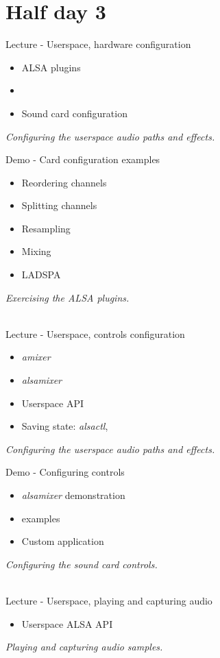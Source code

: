 \documentclass[a4paper,12pt,obeyspaces,spaces,hyphens]{article}
\begin{document}
\section{Half day 3}

\feagendatwocolumn
{Lecture - Userspace, hardware configuration}
{
  \begin{itemize}
  \item ALSA plugins
  \item {}
  \item Sound card configuration
  \end{itemize}
  \vspace{0.5em}
  {\em Configuring the userspace audio paths and effects.}
}
{Demo - Card configuration examples}
{
  \begin{itemize}
  \item Reordering channels
  \item Splitting channels
  \item Resampling
  \item Mixing
  \item LADSPA
  \end{itemize}
  \vspace{0.5em}
  {\em Exercising the ALSA plugins.}
}
\\

\feagendatwocolumn
{Lecture - Userspace, controls configuration}
{
  \begin{itemize}
  \item {\em amixer}
  \item {\em alsamixer}
  \item Userspace API
  \item Saving state: {\em alsactl}, 
  \end{itemize}
  \vspace{0.5em}
  {\em Configuring the userspace audio paths and effects.}
}
{Demo - Configuring controls}
{
  \begin{itemize}
  \item {\em alsamixer} demonstration
  \item {} examples
  \item Custom application
  \end{itemize}
  \vspace{0.5em}
  {\em Configuring the sound card controls.}
}
\\

\feagendaonecolumn
{Lecture - Userspace, playing and capturing audio}
{
  \begin{itemize}
  \item Userspace ALSA API
  \end{itemize}
  \vspace{0.5em}
  {\em Playing and capturing audio samples.}
}
\\
\end{document}
